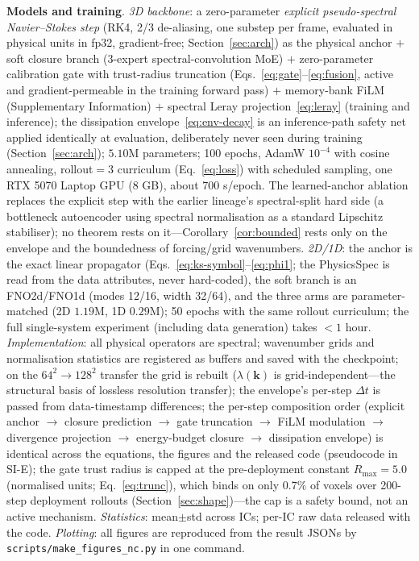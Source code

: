 \documentclass[11pt,a4paper]{article}
\begin{document}
\textbf{Models and training}. \emph{3D backbone}: a zero-parameter \emph{explicit pseudo-spectral Navier--Stokes step} (RK4, 2/3 de-aliasing, one substep per frame, evaluated in physical units in fp32, gradient-free; Section~\ref{sec:arch}) as the physical anchor $+$ soft closure branch (3-expert spectral-convolution MoE) $+$ zero-parameter calibration gate with trust-radius truncation (Eqs.~\eqref{eq:gate}--\eqref{eq:fusion}, active and gradient-permeable in the training forward pass) $+$ memory-bank FiLM (Supplementary Information) $+$ spectral Leray projection~\eqref{eq:leray} (training and inference); the dissipation envelope~\eqref{eq:env-decay} is an inference-path safety net applied identically at evaluation, deliberately never seen during training (Section~\ref{sec:arch}); $5.10$M parameters; 100 epochs, AdamW $10^{-4}$ with cosine annealing, rollout$=3$ curriculum (Eq.~\eqref{eq:loss}) with scheduled sampling, one RTX 5070 Laptop GPU (8 GB), about 700 s/epoch. The learned-anchor ablation replaces the explicit step with the earlier lineage's spectral-split hard side (a bottleneck autoencoder using spectral normalisation as a standard Lipschitz stabiliser); no theorem rests on it---Corollary~\ref{cor:bounded} rests only on the envelope and the boundedness of forcing/grid wavenumbers. \emph{2D/1D}: the anchor is the exact linear propagator (Eqs.~\eqref{eq:ks-symbol}--\eqref{eq:phi1}; the PhysicsSpec is read from the data attributes, never hard-coded), the soft branch is an FNO2d/FNO1d (modes 12/16, width 32/64), and the three arms are parameter-matched (2D $1.19$M, 1D $0.29$M); 50 epochs with the same rollout curriculum; the full single-system experiment (including data generation) takes $<1$ hour. \emph{Implementation}: all physical operators are spectral; wavenumber grids and normalisation statistics are registered as buffers and saved with the checkpoint; on the $64^2{\to}128^2$ transfer the grid is rebuilt ($\lambda(\bm{k})$ is grid-independent---the structural basis of lossless resolution transfer); the envelope's per-step $\Delta t$ is passed from data-timestamp differences; the per-step composition order (explicit anchor $\rightarrow$ closure prediction $\rightarrow$ gate truncation $\rightarrow$ FiLM modulation $\rightarrow$ divergence projection $\rightarrow$ energy-budget closure $\rightarrow$ dissipation envelope) is identical across the equations, the figures and the released code (pseudocode in SI-E); the gate trust radius is capped at the pre-deployment constant $R_{\max}=5.0$ (normalised units; Eq.~\eqref{eq:trunc}), which binds on only $0.7\%$ of voxels over 200-step deployment rollouts (Section~\ref{sec:shape})---the cap is a safety bound, not an active mechanism. \emph{Statistics}: mean$\pm$std across ICs; per-IC raw data released with the code. \emph{Plotting}: all figures are reproduced from the result JSONs by \texttt{scripts/make\_figures\_nc.py} in one command.
\end{document}
